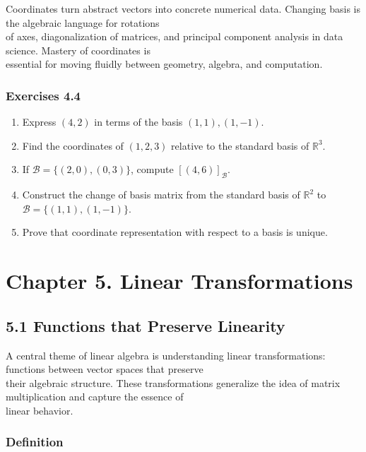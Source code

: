\documentclass[
  12pt,
  a4paper,
]{article}
\let\oldsection\section
\renewcommand{\section}{\clearpage\oldsection}
\begin{document}
Coordinates turn abstract vectors into concrete numerical data. Changing
basis is the algebraic language for rotations\\
of axes, diagonalization of matrices, and principal component analysis
in data science. Mastery of coordinates is\\
essential for moving fluidly between geometry, algebra, and computation.

\subsubsection{Exercises 4.4}\label{exercises-44}

\begin{enumerate}
\def\labelenumi{\arabic{enumi}.}
\item
  Express \((4,2)\) in terms of the basis \((1,1), (1,-1)\).
\item
  Find the coordinates of \((1,2,3)\) relative to the standard basis of
  \(\mathbb{R}^3\).
\item
  If \(\mathcal{B} = \{(2,0), (0,3)\}\), compute
  \([ (4,6) ]_{\mathcal{B}}\).
\item
  Construct the change of basis matrix from the standard basis of
  \(\mathbb{R}^2\) to \(\mathcal{B} = \{(1,1), (1,-1)\}\).
\item
  Prove that coordinate representation with respect to a basis is
  unique.
\end{enumerate}

\section{Chapter 5. Linear
Transformations}\label{chapter-5-linear-transformations}

\subsection{5.1 Functions that Preserve
Linearity}\label{51-functions-that-preserve-linearity}

A central theme of linear algebra is understanding linear
transformations: functions between vector spaces that preserve\\
their algebraic structure. These transformations generalize the idea of
matrix multiplication and capture the essence of\\
linear behavior.

\subsubsection{Definition}\label{definition-3}
\end{document}
